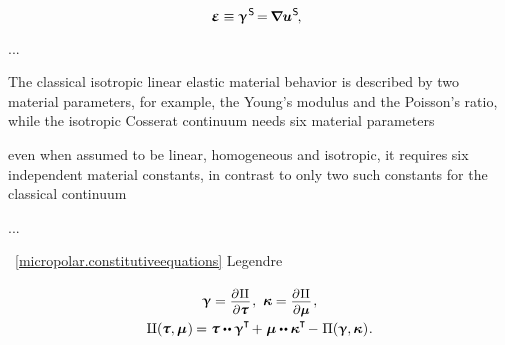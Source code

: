 \begin{equation*}
\infinitesimaldeformation \equiv \distortiontensor^{\hspace{.2ex}\mathsf{S}}
\hspace{-0.3ex} = \hspace{-0.2ex}
\boldnabla {\fieldofdisplacements}^{\hspace{.1ex}\mathsf{S}}
\hspace{-0.25ex} , \:\:
\end{equation*}

...

{\small%
The classical isotropic linear elastic material behavior is described by two material parameters, for example, the Young’s modulus and the Poisson’s ratio, while the isotropic Cosserat continuum needs six material parameters

even when assumed to be linear, homogeneous and isotropic, it requires six independent material constants, in contrast to only two such constants for the classical continuum
\par}

...


~\eqref{micropolar.constitutiveequations}
Legendre

\nopagebreak\vspace{-0.2em}\begin{equation}
\begin{array}{c}
\distortiontensor = \scalebox{.92}{$ \displaystyle \frac{\raisemath{-0.125em}{\partial\hspace{.1ex} \complementaryenergydensity^{\mathstrut}}}{\partial \forcestresstensor}$}
\hspace{.15ex} ,
\hspace{.8ex}
\wrynesstensor = \scalebox{.92}{$ \displaystyle \frac{\raisemath{-0.125em}{\partial\hspace{.1ex} \complementaryenergydensity^{\mathstrut}}}{\partial \couplestresstensor}$}
\hspace{.2ex} ,
\\[.8em]
%
\complementaryenergydensity(\hspace{-0.1ex} \forcestresstensor, \couplestresstensor \hspace{.12ex}) \hspace{-0.12ex}
= \forcestresstensor \dotdotp \distortiontensor^{\T} \hspace{-0.25ex}
+ \hspace{.1ex} \couplestresstensor \dotdotp \wrynesstensor^{\T} \hspace{-0.25ex}
- \hspace{.1ex} \potentialenergydensity (\distortiontensor , \wrynesstensor \hspace{.1ex})
\hspace{.1ex} .
\end{array}
\end{equation}

